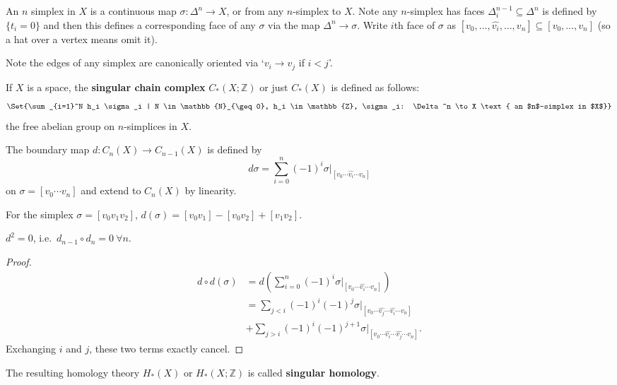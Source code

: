 \documentclass{article}
\begin{document}
An $n$ simplex in $X$ is a continuous map $\sigma: \Delta^n \to X$, or from any $n$-simplex to $X$.
Note any $n$-simplex has faces $\Delta_i^{n-1} \subseteq \Delta^n$ is defined by $\{t_i = 0\}$ and then this defines a corresponding face of any $\sigma$ via the map $\Delta^n \to \sigma$.
Write $i$th face of $\sigma$ as $[v_0, \dotsc, \hat{v_i}, \dotsc, v_n] \subseteq [v_0, \dotsc, v_n]$ (so a hat over a vertex means omit it).

Note the edges of any simplex are canonically oriented via `$v_i \to v_j$ if $i < j$'.

\begin{center}
  \begin{tikzpicture}

  \end{tikzpicture}
\end{center}
\begin{defi}
  If $X$ is a space, the \textbf{singular chain complex} $C_*(X; \mathbb{Z})$ or just $C_*(X)$ is defined as follows:
  \begin{equation*}
    \Set{\sum_{i=1}^N h_i \sigma_i | N \in \mathbb{N}_{\geq 0}, h_i \in \mathbb{Z}, \sigma_i: \Delta^n \to X \text{ an $n$-simplex in $X$}}
  \end{equation*}
  the free abelian group on $n$-simplices in $X$.
\end{defi}
\begin{defi}
  The boundary map $d: C_n(X) \to C_{n-1}(X)$ is defined by
  \begin{equation*}
    d \sigma = \sum_{i=0}^n (-1)^i \sigma|_{[v_0 \dotsm \hat{v_i} \dotsm v_n]}
  \end{equation*}
  on $\sigma=[v_0 \dotsm v_n]$ and extend to $C_n(X)$ by linearity.
\end{defi}
\begin{eg}
  For the simplex $\sigma = [v_0 v_1 v_2]$, $d(\sigma) = [v_0 v_1] - [v_0 v_2] + [v_1 v_2]$.
\end{eg}
\begin{lemma}
  $d^2 = 0$, i.e.\ $d_{n-1} \circ d_n= 0 \ \forall n$.
\end{lemma}
\begin{proof}
  \begin{align*}
    d \circ d(\sigma) &= d\left(\sum_{i=0}^n (-1)^i \sigma|_{[v_0 \dotsm \hat{v_i} \dotsm v_n]}\right)\\
                      &= \sum_{j < i} (-1)^i (-1)^j \sigma|_{[v_0 \dotsm \hat{v_j} \dotsm \hat{v_i} \dotsm v_n]}  \\
                      &+ \sum_{j > i} (-1)^i (-1)^{j+1} \sigma|_{[v_0 \dotsm \hat{v_i} \dotsm \hat{v_j} \dotsm v_n]}.
  \end{align*}
  Exchanging $i$ and $j$, these two terms exactly cancel.
\end{proof}
The resulting homology theory $H_*(X)$ or $H_*(X; \mathbb{Z})$ is called \textbf{singular homology}.
\end{document}
